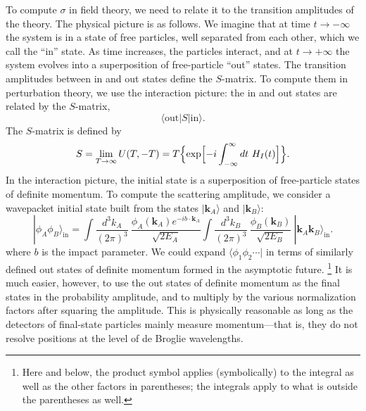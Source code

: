 To compute $\sigma$ in field theory, we need to relate it to the transition
amplitudes of the theory.  The physical picture is as follows.  We imagine
that at time $t\to-\infty$ the system is in a state of free particles, well
separated from each other, which we call the ``in'' state.  As time
increases, the particles interact, and at $t\to+\infty$ the system evolves
into a superposition of free-particle ``out'' states.  The transition
amplitudes between in and out states define the $S$-matrix.  To compute them
in perturbation theory, we use the interaction picture: the in and out states
are related by the $S$-matrix,
\begin{equation}
  \langle \text{out}|S|\text{in}\rangle .
  \label{eq:4.60}
\end{equation}
The $S$-matrix is defined by
\begin{equation}
  S = \lim_{T\to\infty} U(T, -T)
    = T\Bigl\{ \exp\Bigl[ -i\int_{-\infty}^{\infty}dt\ H_I(t) \Bigr] \Bigr\} .
  \label{eq:4.61}
\end{equation}
In the interaction picture, the initial state is a superposition of
free-particle states of definite momentum.  To compute the scattering
amplitude, we consider a wavepacket initial state built from the states
$|\mathbf{k}_A\rangle$ and $|\mathbf{k}_B\rangle$:
\begin{equation}
  |\phi_A\phi_B\rangle_{\mathrm{in}} = \int
    \frac{d^3k_A}{(2\pi)^3}\ \frac{\phi_A(\mathbf{k}_A)e^{-ib\cdot\mathbf{k}_A}}
      {\sqrt{2E_A}}
    \int \frac{d^3k_B}{(2\pi)^3}\ \frac{\phi_B(\mathbf{k}_B)}
      {\sqrt{2E_B}}\ |\mathbf{k}_A\mathbf{k}_B\rangle_{\mathrm{in}} .
  \label{eq:4.68}
\end{equation}
where $b$ is the impact parameter.  We could expand
$\langle\phi_1\phi_2\cdots|$ in terms of similarly defined out states of
definite momentum formed in the asymptotic future.%
\footnote{Here and below, the product symbol applies (symbolically) to the
integral as well as the other factors in parentheses; the integrals apply to
what is outside the parentheses as well.}  It is much easier, however, to use
the out states of definite momentum as the final states in the probability
amplitude, and to multiply by the various normalization factors after
squaring the amplitude.  This is physically reasonable as long as the
detectors of final-state particles mainly measure momentum---that is, they do
not resolve positions at the level of de Broglie wavelengths.

